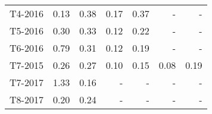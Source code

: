 \begin{tabular}{lrrrrrr}
     T4-2016 &                   0.13 &                0.38 &                   0.17 &                0.37 &                      - &                   - \\
     T5-2016 &                   0.30 &                0.33 &                   0.12 &                0.22 &                      - &                   - \\
     T6-2016 &                   0.79 &                0.31 &                   0.12 &                0.19 &                      - &                   - \\
     T7-2015 &                   0.26 &                0.27 &                   0.10 &                0.15 &                   0.08 &                0.19 \\
     T7-2017 &                   1.33 &                0.16 &                      - &                   - &                      - &                   - \\
     T8-2017 &                   0.20 &                0.24 &                      - &                   - &                      - &                   - \\
\bottomrule
\end{tabular}
